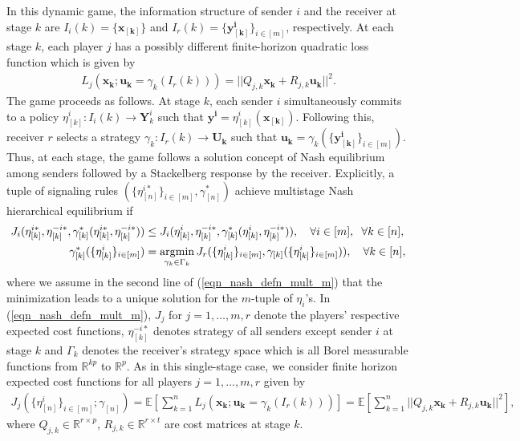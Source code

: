 \documentclass[12pt,journal,onecolumn]{IEEEtran}
\DeclareMathOperator*{\argmin}{\arg\!\min}
\newcommand{\rknote}[1]{\noindent{\leavevmode\color{red}[Raj -- #1]}}
\begin{document}
In this dynamic game,  the information structure of sender $i$ and the receiver at stage $k$ are $I_i(k)=\{\boldsymbol{x_{[k]}}\}$ and  $I_r(k)=\{ \boldsymbol{y^i_{[k]}} \}_{i\in[m]}$, respectively. At each stage $k$, each player $j$ has a possibly different finite-horizon quadratic loss function which is given by
\begin{align}
L_j(\boldsymbol{x_k};\boldsymbol{u_k}=\gamma_k(I_r(k)))=||Q_{j,k}\boldsymbol{x_k}+R_{j,k}\boldsymbol{u_k}||^2.
\end{align}
The game proceeds as follows. At stage $k$, each sender $i$ simultaneously commits to a policy $\eta^i_{[k]}:I_i(k)\rightarrow \boldsymbol{Y}^i_{k}$ such that $\boldsymbol{y^i}=\eta^i_{[k]}(\boldsymbol{x_{[k]}})$. Following this, receiver $r$ selects a strategy $\gamma_k:I_r(k)\rightarrow \boldsymbol{U_k}$ such that $\boldsymbol{u_k}=\gamma_k(\{ \boldsymbol{y^i_{[k]}} \}_{i\in[m]})$. Thus, at each stage, the game follows a solution concept of Nash equilibrium among senders followed by a Stackelberg response by the receiver. %
Explicitly, a tuple of signaling rules $(\{\eta^{i*}_{[n]}\}_{i\in[m]},\gamma^*_{[n]})$ achieve multistage Nash hierarchical equilibrium if
\begin{align}\label{eqn_nash_defn_mult_m}
    J_{i}(\eta^{i*}_{[k]},\eta^{-i*}_{[k]},\gamma_{[k]}^*(\eta^{i*}_{[k]},\eta^{-i*}_{[k]}))&\leq J_{i}(\eta^{i}_{[k]},\eta^{-i*}_{[k]},\gamma_{[k]}^*(\eta^{i}_{[k]},\eta^{-i*}_{[k]})),\quad\forall i\in[m],\hspace{2mm}\forall k\in[n],\nonumber\\
    \gamma_{[k]}^*(\{\eta^{i}_{[k]}\}_{i\in[m]})&=\argmin_{\gamma_k\in\Gamma_k} J_r (\{\eta^i_{[k]}\}_{i\in[m]},\gamma_{[k]}(\{\eta^i_{[k]}\}_{i\in[m]})),\quad\forall k\in[n],
\end{align}
where we assume in the second line of (\ref{eqn_nash_defn_mult_m}) that the minimization leads to a unique solution for the $m$-tuple of $\eta_i$'s. In (\ref{eqn_nash_defn_mult_m}), $J_j$ for $j=1,\hdots, m, r$ denote the players' respective expected cost functions, $\eta^{-i*}_{[k]}$ denotes strategy of all senders except sender $i$ at stage $k$ and $\Gamma_k$ denotes the receiver's strategy space which is all Borel measurable functions from $\mathbb{R}^{kp}$ to $\mathbb{R}^p$. As in this single-stage case, we consider finite horizon expected cost functions for all players $j=1,\hdots, m, r$ given by
\begin{align}\label{Eq: dynobjective}
    J_j(\{\eta^i_{[n]}\}_{i\in[m]};\gamma_{[n]})=\mathbb{E}\left[\sum_{k=1}^n L_j(\boldsymbol{x_k};\boldsymbol{u_k}=\gamma_k(I_r(k)))\right]=\mathbb{E}\left[\sum_{k=1}^n||Q_{j,k}\boldsymbol{x_k}+R_{j,k}\boldsymbol{u_k}||^2\right],
\end{align}
where $Q_{j,k}\in\mathbb{R}^{r\times p}$, $R_{j,k}\in\mathbb{R}^{r\times t}$ are cost matrices at stage $k$.  %
\end{document}
